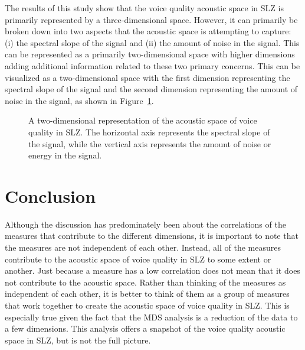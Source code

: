 The results of this study show that the voice quality acoustic space in SLZ is primarily represented by a three-dimensional space. However, it can primarily be broken down into two aspects that the acoustic space is attempting to capture: (i) the spectral slope of the signal and (ii) the amount of noise in the signal. This can be represented as a primarily two-dimensional space with higher dimensions adding additional information related to these two primary concerns. This can be visualized as a two-dimensional space with the first dimension representing the spectral slope of the signal and the second dimension representing the amount of noise in the signal, as shown in Figure~\ref{fig:acoustic_space}.

\begin{figure}[h!]
    \centering
    \caption{A two-dimensional representation of the acoustic space of voice quality in SLZ. The horizontal axis represents the spectral slope of the signal, while the vertical axis represents the amount of noise or energy in the signal.}
    \label{fig:acoustic_space}
\end{figure}

\section{Conclusion} \label{sec:acousticlandscape:conclusion}

Although the discussion has predominately been about the correlations of the measures that contribute to the different dimensions, it is important to note that the measures are not independent of each other. Instead, all of the measures contribute to the acoustic space of voice quality in SLZ to some extent or another. Just because a measure has a low correlation does not mean that it does not contribute to the acoustic space. Rather than thinking of the measures as independent of each other, it is better to think of them as a group of measures that work together to create the acoustic space of voice quality in SLZ. This is especially true given the fact that the MDS analysis is a reduction of the data to a few dimensions. This analysis offers a snapshot of the voice quality acoustic space in SLZ, but is not the full picture. 

